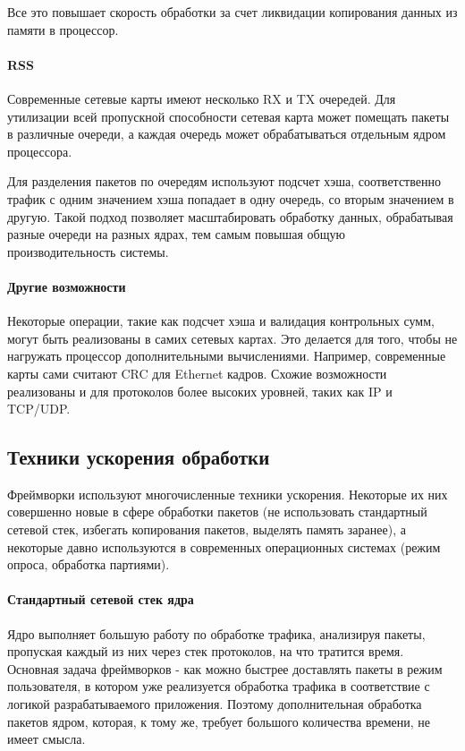 Все это повышает скорость обработки за счет ликвидации копирования данных из памяти в процессор.

\paragraph{RSS}

Современные сетевые карты имеют несколько RX и TX очередей. Для утилизации всей пропускной способности сетевая карта может помещать пакеты в различные очереди, а каждая очередь может обрабатываться отдельным ядром процессора.

Для разделения пакетов по очередям используют подсчет хэша, соответственно трафик с одним значением хэша попадает в одну очередь, со вторым значением в другую. Такой подход позволяет масштабировать обработку данных, обрабатывая разные очереди на разных ядрах, тем самым повышая общую производительность системы.

\paragraph{Другие возможности}

Некоторые операции, такие как подсчет хэша и валидация контрольных сумм, могут быть реализованы в самих сетевых картах. Это делается для того, чтобы не нагружать процессор дополнительными вычислениями. Например, современные карты сами считают CRC для Ethernet кадров. Схожие возможности реализованы и для протоколов более высоких уровней, таких как IP и TCP/UDP.

\subsection{Техники ускорения обработки}
Фреймворки используют многочисленные техники ускорения. Некоторые их них совершенно новые в сфере обработки пакетов (не использовать стандартный сетевой стек, избегать копирования пакетов, выделять память заранее), а некоторые давно используются в современных операционных системах (режим опроса, обработка партиями).

\paragraph{Стандартный сетевой стек ядра}

Ядро выполняет большую работу по обработке трафика, анализируя пакеты, пропуская каждый из них через стек протоколов, на что тратится время. Основная задача фреймворков - как можно быстрее доставлять пакеты в режим пользователя, в котором уже реализуется обработка трафика в соответствие с логикой разрабатываемого приложения. Поэтому дополнительная обработка пакетов ядром, которая, к тому же, требует большого количества времени, не имеет смысла.


